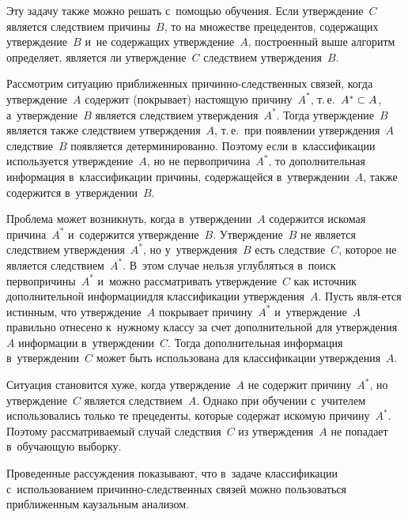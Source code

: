 \begin{multicols}{2}
  Эту задачу также можно решать с~по\-мощью обуче\-ния. Если утверждение~$C$ 
является следствием причины~$B$, то на множестве прецедентов, содержащих 
утверждение~$B$ и~не содержащих утверждение~$A$, построенный выше 
алгоритм определяет, является ли утверждение~$C$ следствием 
утверждения~$B$.

  
  Рассмотрим ситуацию приближенных при\-чин\-но-след\-ст\-вен\-ных связей, когда 
утверждение~$A$ содержит (покрывает) настоящую причину~$A^*$, т.\,е.\ $A^*
\hm\subset A$, а~утверждение~$B$ является следствием утверждения~$A^*$. 
Тогда утверждение~$B$ является также следствием утверждения~$A$, т.\,е.\ при 
появлении утверждения~$A$ следствие~$B$ появляется детерминированно. 
Поэтому если в~классификации используется утверждение~$A$, но не 
первопричина~$A^*$, то дополнительная информация в~классификации причины, 
содержащейся в~утверждении~$A$, также содержится в~утверждении~$B$. 
  
  Проблема может возникнуть, когда в~утверждении~$A$ содержится искомая 
причина~$A^*$ и~содержится утверждение~$B$. Утверждение~$B$ не является 
следствием утверждения~$A^*$, но у~утверждения~$B$ есть следствие~$C$, 
которое не является следствием~$A^*$. В~этом случае нельзя углубляться в~поиск 
первопричины~$A^*$ и~можно рассматривать утверждение~$C$ как источник 
дополнительной информации\linebreak для классификации утверждения~$A$. Пусть 
явля-\linebreak ется истинным, что утверждение~$A$ покрывает причину~$A^*$ 
и~утверждение~$A$ правильно отнесено к~нужному классу за счет 
дополнительной для утверждения~$A$ информации в~утверждении~$C$. Тогда 
дополнительная информация в~утверждении~$C$ может быть использована для 
классификации утверж\-де\-ния~$A$. 
{ %

}
  
  Ситуация становится хуже, когда утверждение~$A$ не содержит 
причину~$A^*$, но утверждение~$C$ является следствием~$A$. Однако при 
обуче\-нии с~учителем использовались только те прецеденты, которые содержат 
искомую причину~$A^*$. Поэтому рассматриваемый случай следствия~$C$ из 
утверждения~$A$ не попадает в~обуча\-ющую выборку. 
  
  Проведенные рассуждения показывают, что в~задаче классификации 
с~использованием при\-чин\-но-след\-ст\-вен\-ных связей можно пользоваться 
приближенным каузальным анализом.
  

\end{multicols}
